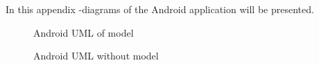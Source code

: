 \label{chap:and_appendix}

In this appendix -diagrams of the Android application will be
presented. 

\begin{figure}[h]
    \caption{Android UML of model}
    \label{fig:and_umlmodel}
\end{figure}  
\begin{figure}[h]	
    \caption{Android UML without model}
    \label{fig:and_uml}
\end{figure}  
\FloatBarrier

